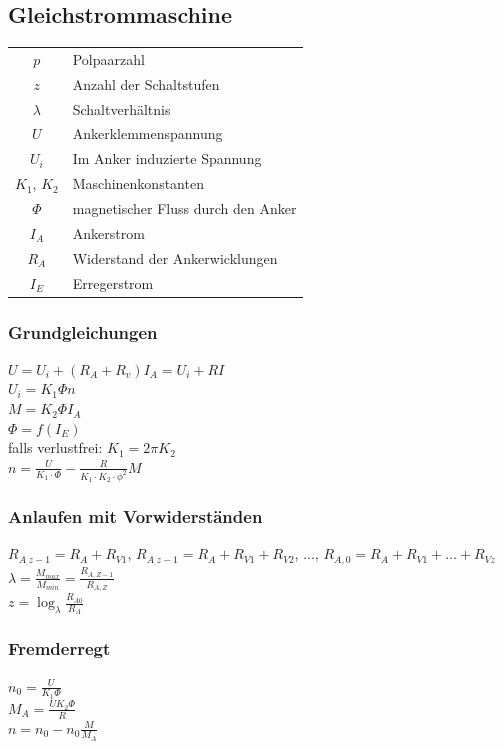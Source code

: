 \documentclass[6pt,a4paper]{scrartcl}
\begin{document}
\begin{multicols}{4}
		\subsection{Gleichstrommaschine}
		
		\begin{tabular}{cl}
		$p$ & Polpaarzahl \\
		$z$ & Anzahl der Schaltstufen \\
		$\lambda$ & Schaltverhältnis \\
		$U$ & Ankerklemmenspannung \\
		$U_i$ & Im Anker induzierte Spannung \\
		$K_1$, $K_2$ & Maschinenkonstanten \\
		$\Phi$ & magnetischer Fluss durch den Anker \\
		$I_A$ & Ankerstrom \\
		$R_A$ & Widerstand der Ankerwicklungen \\
		$I_E$ & Erregerstrom
		\end{tabular}
		
		\subsubsection{Grundgleichungen}
		$U = U_i + (R_A + R_v) I_A = U_i + RI$\\
		$U_i = K_1 \Phi n$\\
		$M = K_2 \Phi I_A$\\
		$\Phi = f(I_E)$\\
		falls verlustfrei: $K_1 = 2 \pi K_2$ \\
		$n = \frac{U}{ K_1 \cdot \Phi} - \frac{R}{K_1 \cdot K_2 \cdot \phi^2}M$\\
		
		
		\subsubsection{Anlaufen mit Vorwiderständen}
		$R_{A_,z-1} = R_A + R_{V1}$, $R_{A_,z-1} = R_A + R_{V1} + R_{V2}$, ..., $R_{A,0} = R_A + R_{V1} + \hdots + R_{Vz}$ \\
		$\lambda = \frac{M_{max}}{M_{min}} = \frac{R_{A,Z-1}}{R_{A,Z}}$ \\
		$ z = \log_\lambda \frac{R_{A0}}{R_A}$
		
		
		\subsubsection{Fremderregt}
		$n_0 = \frac{U}{K_1 \Phi}$ \\
		$M_A = \frac{U K_2 \Phi}{R}$ \\
		$n = n_0 - n_0 \frac{M}{M_A}$
		

\end{multicols}
\end{document}
